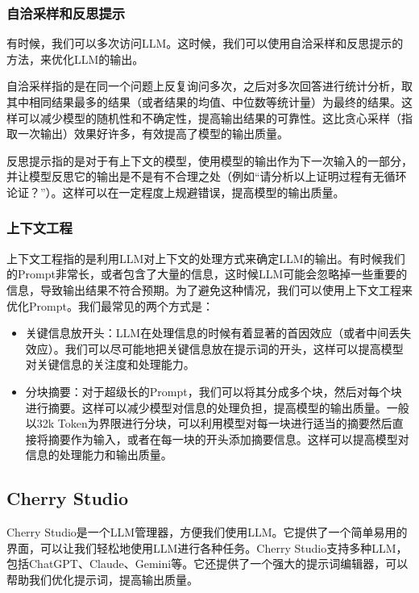 \documentclass[../main.tex]{subfiles}
\begin{document}
\subsubsection{自洽采样和反思提示}

有时候，我们可以多次访问LLM。这时候，我们可以使用自洽采样和反思提示的方法，来优化LLM的输出。

自洽采样指的是在同一个问题上反复询问多次，之后对多次回答进行统计分析，取其中相同结果最多的结果（或者结果的均值、中位数等统计量）为最终的结果。这样可以减少模型的随机性和不确定性，提高输出结果的可靠性。这比贪心采样（指取一次输出）效果好许多，有效提高了模型的输出质量。

反思提示指的是对于有上下文的模型，使用模型的输出作为下一次输入的一部分，并让模型反思它的输出是不是有不合理之处（例如“请分析以上证明过程有无循环论证？”）。这样可以在一定程度上规避错误，提高模型的输出质量。

\subsubsection{上下文工程}

上下文工程指的是利用LLM对上下文的处理方式来确定LLM的输出。有时候我们的Prompt非常长，或者包含了大量的信息，这时候LLM可能会忽略掉一些重要的信息，导致输出结果不符合预期。为了避免这种情况，我们可以使用上下文工程来优化Prompt。我们最常见的两个方式是：
\begin{itemize}
  \item 关键信息放开头：LLM在处理信息的时候有着显著的首因效应（或者中间丢失效应）。我们可以尽可能地把关键信息放在提示词的开头，这样可以提高模型对关键信息的关注度和处理能力。
  \item 分块摘要：对于超级长的Prompt，我们可以将其分成多个块，然后对每个块进行摘要。这样可以减少模型对信息的处理负担，提高模型的输出质量。一般以32k Token为界限进行分块，可以利用模型对每一块进行适当的摘要然后直接将摘要作为输入，或者在每一块的开头添加摘要信息。这样可以提高模型对信息的处理能力和输出质量。
\end{itemize}

\subsection{Cherry Studio}

Cherry Studio是一个LLM管理器，方便我们使用LLM。它提供了一个简单易用的界面，可以让我们轻松地使用LLM进行各种任务。Cherry Studio支持多种LLM，包括ChatGPT、Claude、Gemini等。它还提供了一个强大的提示词编辑器，可以帮助我们优化提示词，提高输出质量。
\end{document}
